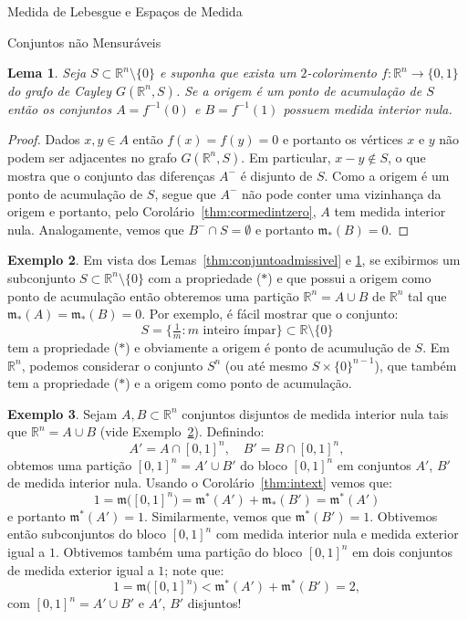 \documentclass[oneside,final,11pt]{amsbook}
\newcommand{\R}{\mathds R}
\newcommand{\leb}{\mathfrak m}
\theoremstyle{remark}\newtheorem{exercise}{Exercício}[chapter]
\theoremstyle{remark}\newtheorem{*exercise}[exercise]{\hbox to 0pt{\hskip 0pt minus 1fil*}Exercício}
\theoremstyle{definition}\newtheorem{exdefin}{Definição}[chapter]
\theoremstyle{plain}\newtheorem{teo}{Teorema}[section]
\theoremstyle{plain}\newtheorem{lem}[teo]{Lema}
\theoremstyle{plain}\newtheorem{prop}[teo]{Proposição}
\theoremstyle{plain}\newtheorem{cor}[teo]{Corolário}
\theoremstyle{definition}\newtheorem{defin}[teo]{Definição}
\theoremstyle{remark}\newtheorem{rem}[teo]{Observação}
\theoremstyle{definition}\newtheorem{notation}[teo]{Notação}
\theoremstyle{definition}\newtheorem{convention}[teo]{Convenção}
\theoremstyle{definition}\newtheorem{example}[teo]{Exemplo}
\numberwithin{section}{chapter}
\numberwithin{equation}{section}
\begin{document}
\begin{chapter}{Medida de Lebesgue e Espaços de Medida}
\begin{section}{Conjuntos não Mensuráveis}
\begin{lem}\label{thm:particaomedintzero}
Seja $S\subset\R^n\setminus\{0\}$ e suponha que exista um $2$-colorimento $f:\R^n\to\{0,1\}$
do grafo de Cayley $G(\R^n,S)$. Se a origem é um ponto de acumulação de $S$ então os conjuntos
$A=f^{-1}(0)$ e $B=f^{-1}(1)$ possuem medida interior nula.
\end{lem}
\begin{proof}
Dados $x,y\in A$ então $f(x)=f(y)=0$ e portanto os vértices $x$ e $y$ não podem ser adjacentes
no grafo $G(\R^n,S)$. Em particular, $x-y\not\in S$, o que mostra que o conjunto das diferenças
$A^-$ é disjunto de $S$. Como a origem é um ponto de acumulação de $S$, segue que $A^-$ não pode
conter uma vizinhança da origem e portanto, pelo Corolário~\ref{thm:cormedintzero},
$A$ tem medida interior nula. Analogamente, vemos que $B^-\cap S=\emptyset$ e portanto
$\leb_*(B)=0$.
\end{proof}

\begin{example}\label{exa:partbizarraRn}
Em vista dos Lemas~\ref{thm:conjuntoadmissivel} e \ref{thm:particaomedintzero}, se exibirmos
um subconjunto $S\subset\R^n\setminus\{0\}$ com a propriedade ($*$) e que possui a origem como ponto de acumulação
então obteremos uma partição $\R^n=A\cup B$ de $\R^n$ tal que $\leb_*(A)=\leb_*(B)=0$. Por exemplo, é fácil
mostrar que o conjunto:
\[S=\big\{\tfrac1m:\text{$m$ inteiro ímpar}\big\}\subset\R\setminus\{0\}\]
tem a propriedade ($*$) e obviamente a origem é ponto de acumulução de $S$. Em $\R^n$, podemos considerar
o conjunto $S^n$ (ou até mesmo $S\times\{0\}^{n-1}$), que também tem a propriedade ($*$) e a origem como ponto
de acumulação.
\end{example}

\begin{example}
Sejam $A,B\subset\R^n$ conjuntos disjuntos de medida interior nula tais que $\R^n=A\cup B$ (vide Exemplo~\ref{exa:partbizarraRn}).
Definindo:
\[A'=A\cap[0,1]^n,\quad B'=B\cap[0,1]^n,\]
obtemos uma partição $[0,1]^n=A'\cup B'$ do bloco $[0,1]^n$ em conjuntos
$A'$, $B'$ de medida interior nula. Usando o Corolário~\ref{thm:intext} vemos que:
\[1=\leb\big([0,1]^n\big)=\leb^*(A')+\leb_*(B')=\leb^*(A')\]
e portanto $\leb^*(A')=1$. Similarmente, vemos que $\leb^*(B')=1$. Obtivemos então subconjuntos do bloco $[0,1]^n$
com medida interior nula e medida exterior igual a $1$. Obtivemos também uma partição do bloco $[0,1]^n$ em dois
conjuntos de medida exterior igual a $1$; note que:
\[1=\leb\big([0,1]^n\big)<\leb^*(A')+\leb^*(B')=2,\]
com $[0,1]^n=A'\cup B'$ e $A'$, $B'$ disjuntos!
\end{example}


\end{section}
\end{chapter}
\end{document}
